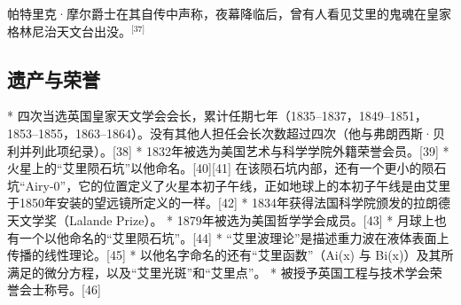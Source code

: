 帕特里克·摩尔爵士在其自传中声称，夜幕降临后，曾有人看见艾里的鬼魂在皇家格林尼治天文台出没。\(^\text{[37]}\)
\subsection{遗产与荣誉}
* 四次当选英国皇家天文学会会长，累计任期七年（1835–1837，1849–1851，1853–1855，1863–1864）。没有其他人担任会长次数超过四次（他与弗朗西斯·贝利并列此项纪录）。[38]
* 1832年被选为美国艺术与科学学院外籍荣誉会员。[39]
* 火星上的“艾里陨石坑”以他命名。[40][41] 在该陨石坑内部，还有一个更小的陨石坑“Airy-0”，它的位置定义了火星本初子午线，正如地球上的本初子午线是由艾里于1850年安装的望远镜所定义的一样。[42]
* 1834年获得法国科学院颁发的拉朗德天文学奖（Lalande Prize）。
* 1879年被选为美国哲学学会成员。[43]
* 月球上也有一个以他命名的“艾里陨石坑”。[44]
* “艾里波理论”是描述重力波在液体表面上传播的线性理论。[45]
* 以他名字命名的还有“艾里函数”（Ai(x) 与 Bi(x)）及其所满足的微分方程，以及“艾里光斑”和“艾里点”。
* 被授予英国工程与技术学会荣誉会士称号。[46]
